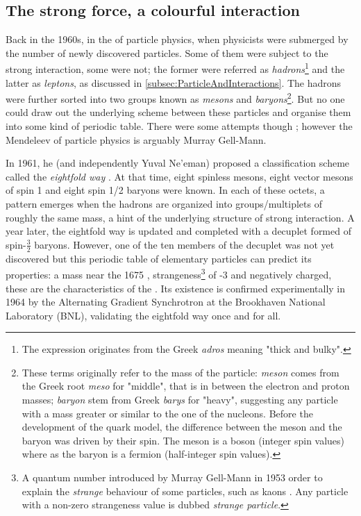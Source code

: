 \subsection{The strong force, a colourful interaction}
\label{subsec:strongforce}

Back in the 1960s, in the  of particle physics, when physicists were submerged by the number of newly discovered  particles. Some of them were subject to the strong interaction, some were not; the former were referred as \textit{hadrons}\footnote{The expression originates from the Greek \textit{adros} meaning "thick and bulky".} and the latter as \textit{leptons}, as discussed in \Sec\ref{subsec:ParticleAndInteractions}. The hadrons were further sorted into two groups known as \textit{mesons} and \textit{baryons}\footnote{These terms originally refer to the mass of the particle: \textit{meson} comes from the Greek root \textit{meso} for "middle", that is in between the electron and proton masses; \textit{baryon} stem from Greek \textit{barys} for "heavy", suggesting any particle with a mass greater or similar to the one of the nucleons. Before the development of the quark model, the difference between the meson and the baryon was driven by their spin. The meson is a boson (integer spin values) where as the baryon is a fermion (half-integer spin values)\cite{s.glashowInteractionsJourneyMind1990}.}. But no one could draw out the underlying scheme between these particles and organise them into some kind of periodic table. There were some attempts though \cite{sakataCompositeModelNew1956}\cite{sakuraiTheoryStrongInteractions1960}; however the Mendeleev of particle physics is arguably Murray Gell-Mann. 

In 1961, he (and independently Yuval Ne'eman) proposed a classification scheme called the \textit{eightfold way} \cite{gell-mannEIGHTFOLDWAYTHEORY1961}\cite{neemanDerivationStrongInteractions1961}. At that time, eight spinless mesons, eight vector mesons of spin 1 and eight spin 1/2 baryons were known. In each of these octets, a pattern emerges when the hadrons are organized into groups/multiplets of roughly the same mass, a hint of the underlying structure of strong interaction. A year later, the eightfold way is updated and completed with a decuplet formed of spin-$\frac{3}{2}$ baryons. However, one of the ten members of the decuplet was not yet discovered but this periodic table of elementary particles can predict its properties: a mass near the 1675 \mmass, strangeness\footnote{A quantum number introduced by Murray Gell-Mann in 1953 order to explain the \textit{strange} behaviour of some particles, such as kaons \cite{gell-mannIsotopicSpinNew1953}. Any particle with a non-zero strangeness value is dubbed \textit{strange particle}.} of -3 and negatively charged, these are the characteristics of the \rmOmegaM. Its existence is confirmed experimentally in 1964 by the Alternating Gradient Synchrotron at the Brookhaven National Laboratory (BNL)\cite{barnesObservationHyperonStrangeness1964a}, validating the eightfold way once and for all.\\

